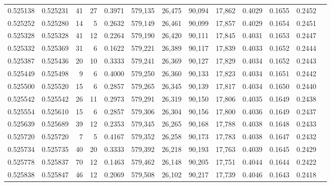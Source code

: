 \begin{tabular}{rrrrrrrrrrrrr}
0.525138 & 0.525231 &    41 &    27 &                                     0.3971 & 579,135 &  26,475 &  90,094 &  17,862 & 0.4029 & 0.1655 & 0.2452 \\
0.525252 & 0.525280 &    14 &     5 &                                     0.2632 & 579,149 &  26,461 &  90,099 &  17,857 & 0.4029 & 0.1654 & 0.2451 \\
0.525328 & 0.525328 &    41 &    12 &                                     0.2264 & 579,190 &  26,420 &  90,111 &  17,845 & 0.4031 & 0.1653 & 0.2447 \\
0.525332 & 0.525369 &    31 &     6 &                                     0.1622 & 579,221 &  26,389 &  90,117 &  17,839 & 0.4033 & 0.1652 & 0.2444 \\
0.525387 & 0.525436 &    20 &    10 &                                     0.3333 & 579,241 &  26,369 &  90,127 &  17,829 & 0.4034 & 0.1652 & 0.2443 \\
0.525449 & 0.525498 &     9 &     6 &                                     0.4000 & 579,250 &  26,360 &  90,133 &  17,823 & 0.4034 & 0.1651 & 0.2442 \\
0.525500 & 0.525520 &    15 &     6 &                                     0.2857 & 579,265 &  26,345 &  90,139 &  17,817 & 0.4034 & 0.1650 & 0.2440 \\
0.525542 & 0.525542 &    26 &    11 &                                     0.2973 & 579,291 &  26,319 &  90,150 &  17,806 & 0.4035 & 0.1649 & 0.2438 \\
0.525554 & 0.525610 &    15 &     6 &                                     0.2857 & 579,306 &  26,304 &  90,156 &  17,800 & 0.4036 & 0.1649 & 0.2437 \\
0.525639 & 0.525689 &    39 &    12 &                                     0.2353 & 579,345 &  26,265 &  90,168 &  17,788 & 0.4038 & 0.1648 & 0.2433 \\
0.525720 & 0.525720 &     7 &     5 &                                     0.4167 & 579,352 &  26,258 &  90,173 &  17,783 & 0.4038 & 0.1647 & 0.2432 \\
0.525734 & 0.525735 &    40 &    20 &                                     0.3333 & 579,392 &  26,218 &  90,193 &  17,763 & 0.4039 & 0.1645 & 0.2429 \\
0.525778 & 0.525837 &    70 &    12 &                                     0.1463 & 579,462 &  26,148 &  90,205 &  17,751 & 0.4044 & 0.1644 & 0.2422 \\
0.525838 & 0.525847 &    46 &    12 &                                     0.2069 & 579,508 &  26,102 &  90,217 &  17,739 & 0.4046 & 0.1643 & 0.2418 \\

\end{tabular}
